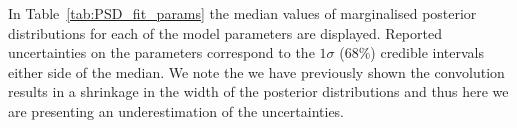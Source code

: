 In Table~\ref{tab:PSD_fit_params} the median values of marginalised posterior distributions for each of the model parameters are displayed. Reported uncertainties on the parameters correspond to the $1\sigma$ ($68 \%$) credible intervals either side of the median. We note the we have previously shown the convolution results in a shrinkage in the width of the posterior distributions and thus here we are presenting an underestimation of the uncertainties.

%
%			
%			
%			
%			
%			
%			
%			
%			
%			
%			


